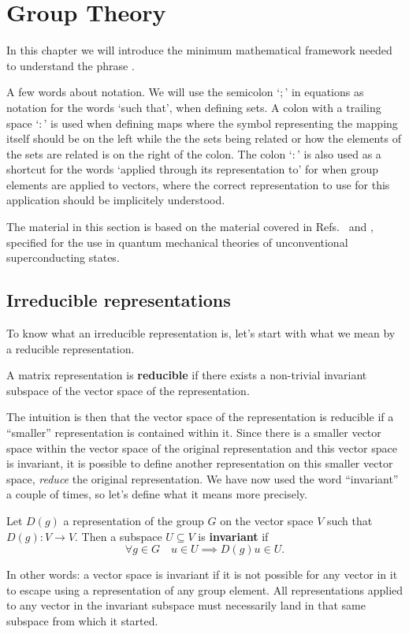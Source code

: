 \chapter{Group Theory}

In this chapter we will introduce the minimum mathematical framework needed to
understand the phrase .

A few words about notation. We will use the semicolon `$;$' in equations as notation for the words `such that', \eg when defining sets.
A colon with a trailing space `$\colon$' is used when defining maps where the symbol representing the mapping itself should be on the left while the the sets
being related or how the elements of the sets are related is on the right of the colon. The colon `$:$' is also used as a shortcut for the
words `applied through its representation to' for when group elements are applied to vectors, where the correct representation to use
for this application should be implicitely understood.

The material in this section is based on the material covered in Refs.~\cite{Inui90} and \cite{NegeleOrland98}, specified for the use in
quantum mechanical theories of unconventional superconducting states.

\section{Irreducible representations}

To know what an irreducible representation is, let's start with what we mean by a reducible representation.
\begin{defi}
    A matrix representation is \textbf{reducible} if there exists a non-trivial invariant subspace of the vector space of the representation.
\end{defi}
The intuition is then that the vector space of the representation is reducible if a ``smaller'' representation is contained within it. Since
there is a smaller vector space within the vector space of the original representation and this vector space is invariant, it is possible
to define another representation on this smaller vector space, \ie\emph{reduce} the original representation. We have now used the word
``invariant'' a couple of times, so let's define what it means more precisely.

\begin{defi}
    Let $D(g)$ a representation of the group $G$ on the vector space $V$ such that $D(g)\colon V\rightarrow V$. Then
    a subspace $U\subseteq V$ is \textbf{invariant} if 
    \begin{equation}
        \label{eq:Group:Irr:invariantDef}
        \forall g\in G\quad u\in U \implies D(g)u\in U.
    \end{equation}
\end{defi}
In other words: a vector space is invariant if it is not possible for any vector in it to escape using a representation of any group element.
All representations applied to any vector in the invariant subspace must necessarily land in that same subspace from which it started.

